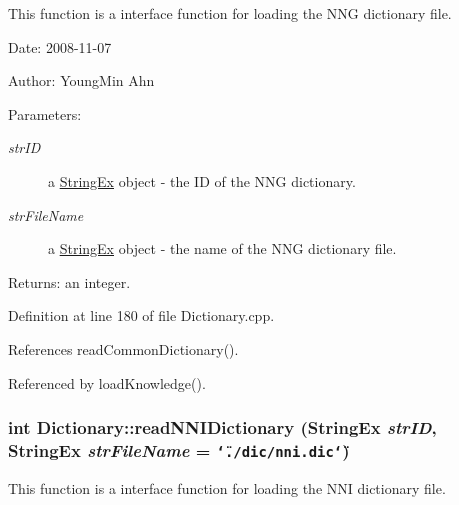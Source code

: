This function is a interface function for loading the NNG dictionary file. 

\begin{Desc}
\item[Date:]2008-11-07 \end{Desc}
\begin{Desc}
\item[Author:]YoungMin Ahn \end{Desc}
\begin{Desc}
\item[Parameters:]
\begin{description}
\item[{\em strID}]a \hyperlink{classStringEx}{StringEx} object - the ID of the NNG dictionary. \item[{\em strFileName}]a \hyperlink{classStringEx}{StringEx} object - the name of the NNG dictionary file. \end{description}
\end{Desc}
\begin{Desc}
\item[Returns:]an integer. \end{Desc}


Definition at line 180 of file Dictionary.cpp.

References readCommonDictionary().

Referenced by loadKnowledge().\hypertarget{classkmaOrange_1_1Dictionary_2bd3731eff30bd2fb68752357c5db962}{
\subsubsection[{readNNIDictionary}]{\setlength{\rightskip}{0pt plus 5cm}int Dictionary::readNNIDictionary ({\bf StringEx} {\em strID}, \/  {\bf StringEx} {\em strFileName} = {\tt \char`\"{}./dic/nni.dic\char`\"{}})}}
\label{classkmaOrange_1_1Dictionary_2bd3731eff30bd2fb68752357c5db962}


This function is a interface function for loading the NNI dictionary file. 

